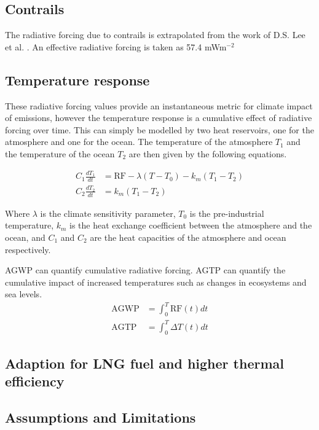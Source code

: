 \documentclass{article}
\begin{document}
\subsection{Contrails}

The radiative forcing due to contrails is extrapolated from the work of D.S. Lee et al. \cite{contrail_radiative_forcing}.
An effective radiative forcing is taken as 57.4 mWm$^{-2}$



\subsection{Temperature response}

These radiative forcing values provide an instantaneous metric for climate impact of emissions, however
the temperature response is a cumulative effect of radiative forcing over time.
This can simply be modelled by two heat reservoirs, one for the atmosphere and one for the ocean.
The temperature of the atmosphere $T_1$ and the temperature of the ocean $T_2$ are then given by the following equations.

\begin{align}
    C_1 \frac{dT_1}{dt} &= \text{RF} - \lambda(T - T_0) - k_m(T_1 - T_2) \\
    C_2 \frac{dT_2}{dt} &= k_m(T_1 - T_2)
\end{align}

Where $\lambda$ is the climate sensitivity parameter, $T_0$ is the pre-industrial temperature, $k_m$ is the heat exchange coefficient between the atmosphere and the ocean, and $C_1$ and $C_2$ are the heat capacities of the atmosphere and ocean respectively.

AGWP can quantify cumulative radiative forcing.
AGTP can quantify the cumulative impact of increased temperatures such as changes in ecosystems and sea levels.
\begin{align}
    \text{AGWP} &= \int_0^T \text{RF}(t) dt \\
    \text{AGTP} &= \int_0^T \Delta T(t) dt
\end{align}

\subsection{Adaption for LNG fuel and higher thermal efficiency}

\subsection{Assumptions and Limitations}
\end{document}
